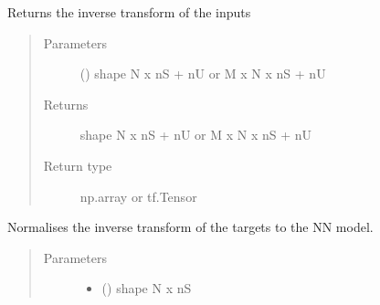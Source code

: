 \documentclass[letterpaper,10pt,english,openany,oneside]{sphinxmanual}
\begin{document}
\begin{fulllineitems}
\begin{fulllineitems}
\end{fulllineitems}


\begin{fulllineitems}
\label{\detokenize{_modules/utils:utils.ModelScaler.ModelScaler.inverse_transformInput}}
Returns the inverse transform of the inputs
\begin{quote}\begin{description}
\item[{Parameters}] \leavevmode
{} () \textendash{} shape N x nS + nU or M x N x nS + nU

\item[{Returns}] \leavevmode
shape N x nS + nU or M x N x nS + nU

\item[{Return type}] \leavevmode
np.array or tf.Tensor

\end{description}\end{quote}

\end{fulllineitems}


\begin{fulllineitems}
\label{\detokenize{_modules/utils:utils.ModelScaler.ModelScaler.inverse_transformOutput}}
Normalises the inverse transform of the targets to the NN model.
\begin{quote}\begin{description}
\item[{Parameters}] \leavevmode\begin{itemize}
\item {} 
 () \textendash{} shape N x nS


\end{itemize}
\end{description}
\end{quote}
\end{fulllineitems}
\end{fulllineitems}
\end{document}
